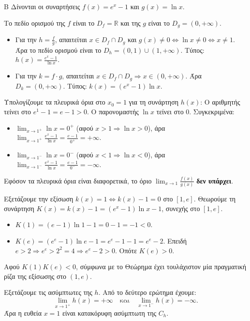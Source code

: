 \begin{thema}{Β}
Δίνονται οι συναρτήσεις $f(x) = e^x - 1$ και $g(x) = \ln x$. 
\begin{erwthma}
\item Το πεδίο ορισμού της $f$ είναι το $D_f = \mathbb{R}$ και της $g$ είναι το $D_g = (0, +\infty)$.
\begin{itemize}
\item Για την $h = \frac{f}{g}$, απαιτείται $x \in D_f \cap D_g$ και $g(x) \ne 0 \Leftrightarrow \ln x \ne 0 \Leftrightarrow x \ne 1$.
Άρα το πεδίο ορισμού είναι το $D_h = (0, 1) \cup (1, +\infty)$. 
Τύπος: $h(x) = \frac{e^x - 1}{\ln x}$.
\item Για την $k = f \cdot g$, απαιτείται $x \in D_f \cap D_g \Rightarrow x \in (0, +\infty)$.
Άρα $D_k = (0, +\infty)$. Τύπος: $k(x) = (e^x - 1) \ln x$.
\end{itemize}

\item Υπολογίζουμε τα πλευρικά όρια στο $x_0 = 1$ για τη συνάρτηση $h(x)$:
Ο αριθμητής τείνει στο $e^1 - 1 = e - 1 > 0$.
Ο παρονομαστής $\ln x$ τείνει στο $0$. Συγκεκριμένα:
\begin{itemize}
\item $\lim_{x\to1^+} \ln x = 0^+$ (αφού $x>1 \Rightarrow \ln x > 0$), άρα $\lim_{x\to1^+} \frac{e^x-1}{\ln x} = \frac{e-1}{0^+} = +\infty$.
\item $\lim_{x\to1^-} \ln x = 0^-$ (αφού $x<1 \Rightarrow \ln x < 0$), άρα $\lim_{x\to1^-} \frac{e^x-1}{\ln x} = \frac{e-1}{0^-} = -\infty$.
\end{itemize}
Εφόσον τα πλευρικά όρια είναι διαφορετικά, το όριο $\lim_{x\to1} \frac{f(x)}{g(x)}$ \textbf{δεν υπάρχει}.

\item Εξετάζουμε την εξίσωση $k(x) = 1 \Leftrightarrow k(x) - 1 = 0$ στο $[1, e]$.
Θεωρούμε τη συνάρτηση $K(x) = k(x) - 1 = (e^x-1)\ln x - 1$, συνεχής στο $[1, e]$.
\begin{itemize}
\item $K(1) = (e-1)\ln 1 - 1 = 0 - 1 = -1 < 0$.
\item $K(e) = (e^e-1)\ln e - 1 = e^e - 1 - 1 = e^e - 2$. Επειδή $e > 2 \Rightarrow e^e > 2^2 = 4 \Rightarrow e^e-2 > 0$. 
Οπότε $K(e) > 0$.
\end{itemize}
Αφού $K(1)K(e) < 0$, σύμφωνα με το Θεώρημα  έχει τουλάχιστον μία πραγματική ρίζα της εξίσωσης στο $(1, e)$.

\item Εξετάζουμε τις ασύμπτωτες της $h$.
Από το δεύτερο ερώτημα έχουμε:
\[ \lim_{x\to1^+} h(x)=+\infty \quad \text{και} \quad \lim_{x\to1^-} h(x)=-\infty. \]
Άρα η ευθεία $x=1$ είναι κατακόρυφη ασύμπτωτη της $C_h$.


\end{erwthma}
\end{thema}
